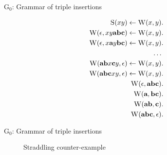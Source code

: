 \documentclass{beamer}
\newcommand\s{\textsc}
\begin{document}
	\begin{frame}{G$_0$: Grammar of triple insertions}
		\begin{figure}[h!]
		\begin{align}
		\setcounter{equation}{0}
		\s{S}(xy) \leftarrow \s{W}(x,y)&. \\
		\s{W}(\epsilon, xy\textbf{abc}) \leftarrow \s{W}(x,y)&. \\
		\s{W}(\epsilon, x\textbf{a}y\textbf{bc}) \leftarrow \s{W}(x,y)&. \\
		\dots \nonumber \\
		\setcounter{equation}{59}
		\s{W}(\textbf{ab}x\textbf{c}y, \epsilon) \leftarrow \s{W}(x,y)&. \\
		\s{W}(\textbf{abc}xy, \epsilon) \leftarrow \s{W}(x,y)&. \\
		\s{W}(\epsilon, \textbf{abc})&. \\
		\s{W}(\textbf{a}, \textbf{bc})&. \\
		\s{W}(\textbf{ab}, \textbf{c})&. \\
		\s{W}(\textbf{abc}, \epsilon)&.
		\end{align}
		\end{figure}
	\end{frame}

	\begin{frame}{G$_0$: Grammar of triple insertions}
		\begin{figure}[h!]
		\centering
		
		\caption*{Straddling counter-example}
		\end{figure}
	\end{frame}
\end{document}
